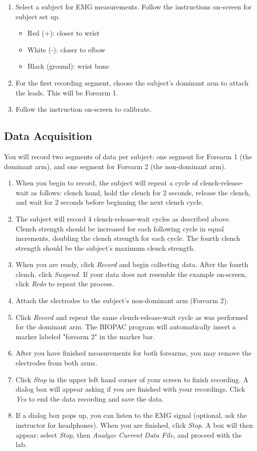 \documentclass{article}
\begin{document}
\begin{enumerate}
	\item Select a subject for EMG measurements. Follow the instructions on-screen for subject set up.
		\begin{itemize}
			\item Red (+): closer to wrist
			\item White (-): closer to elbow
			\item Black (ground): wrist bone
		\end{itemize}
	\item For the first recording segment, choose the subject's dominant arm to attach the leads. This will be Forearm 1.
	\item Follow the instruction on-screen to calibrate.
\end{enumerate}

\subsection*{Data Acquisition}
You will record two segments of data per subject: one segment for Forearm 1 (the dominant arm), and one segment for Forearm 2 (the non-dominant arm).
\begin{enumerate}
	\item When you begin to record, the subject will repeat a cycle of clench-release-wait as follows: clench hand, hold the clench for 2 seconds, release the clench, and wait for 2 seconds before beginning the next clench cycle.
	\item The subject will record 4 clench-release-wait cycles as described above. Clench strength should be increased for each following cycle in equal increments, doubling the clench strength for each cycle. The fourth clench strength should be the subject's maximum clench strength.
	\item When you are ready, click \textit{Record} and begin collecting data. After the fourth clench, click \textit{Suspend.} If your data does not resemble the example on-screen, click \textit{Redo} to repeat the process.
	\item Attach the electrodes to the subject's non-dominant arm (Forearm 2).
	\item Click \textit{Record} and repeat the same clench-release-wait cycle as was performed for the dominant arm. The BIOPAC program will automatically insert a marker labeled "forearm 2" in the marker bar.
	\item After you have finished measurements for both forearms, you may remove the electrodes from both arms.
	\item Click \textit{Stop} in the upper left hand corner of your screen to finish recording. A dialog box will appear asking if you are finished with your recordings. Click \textit{Yes} to end the data recording and save the data.
	\item If a dialog box pops up, you can listen to the EMG signal (optional, ask the instructor for headphones). When you are finished, click \textit{Stop}. A box will then appear; select \textit{Stop}, then \textit{Analyze Current Data File}, and proceed with the lab.
\end{enumerate}
\end{document}

